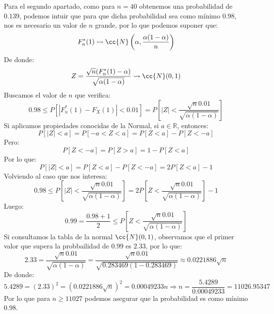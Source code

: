 \begin{ejercicio}
    \noindent
    Para el segundo apartado, como para $n=40$ obtenemos una probabilidad de $0.139$, podemos intuir que para que dicha probabilidad sea como mínimo $0.98$, nos es necesario un valor de $n$ grande, por lo que podemos suponer que:
    \begin{equation*}
        F_n^\ast(1) \rightsquigarrow \cc{N}\left(\alpha, \dfrac{\alpha(1-\alpha)}{n}\right)
    \end{equation*}
    De donde:
    \begin{equation*}
        Z = \dfrac{\sqrt{n}(F_n^\ast(1)-\alpha)}{\sqrt{\alpha(1-\alpha)}} \rightsquigarrow \cc{N}(0,1)
    \end{equation*}
    Buscamos el valor de $n$ que verifica:
    \begin{equation*}
        0.98 \leq P[|F_n^\ast(1) - F_X(1)| < 0.01] = P\left[|Z| < \dfrac{\sqrt{n}0.01}{\sqrt{\alpha(1-\alpha)}}\right]
    \end{equation*}
    Si aplicamos propiedades conocidas de la Normal, si $a\in \mathbb{R}$, entonces:
    \begin{equation*}
        P[|Z| < a] = P[-a < Z < a] = P[Z<a] - P[Z< -a]
    \end{equation*}
    Pero:
    \begin{equation*}
        P[Z< -a] = P[Z>a] = 1-P[Z<a]
    \end{equation*}
    Por lo que:
    \begin{equation*}
        P[|Z| < a] = P[Z<a] - P[Z < -a] = 2P[Z<a] - 1
    \end{equation*}
    Volviendo al caso que nos interesa:
    \begin{equation*}
        0.98 \leq P\left[|Z| < \dfrac{\sqrt{n}0.01}{\sqrt{\alpha(1-\alpha)}}\right] = 2P\left[Z<\dfrac{\sqrt{n}0.01}{\sqrt{\alpha(1-\alpha)}}\right] - 1
    \end{equation*}
    Luego:
    \begin{equation*}
        0.99 = \dfrac{0.98+1}{2} \leq P\left[Z < \dfrac{\sqrt{n}0.01}{\sqrt{\alpha(1-\alpha)}}\right]
    \end{equation*}
    Si consultamos la tabla de la normal $\cc{N}(0,1)$, observamos que el primer valor que supera la probbailidad de $0.99$ es $2.33$, por lo que:
    \begin{equation*}
        2.33 = \dfrac{\sqrt{n}0.01}{\sqrt{\alpha(1-\alpha)}} = \dfrac{\sqrt{n}0.01}{\sqrt{0.283469(1-0.283469)}} \approx 0.0221886 \sqrt{n}
    \end{equation*}
    De donde:
    \begin{equation*}
        5.4289 = {(2.33)}^{2} = {(0.0221886\sqrt{n})}^{2} = 0.00049233 n \Longrightarrow n = \dfrac{5.4289}{0.00049233} = 11026.95347
    \end{equation*}
    Por lo que para $n \geq 11027$ podemos asegurar que la probabilidad es como mínimo $0.98$.
\end{ejercicio}

